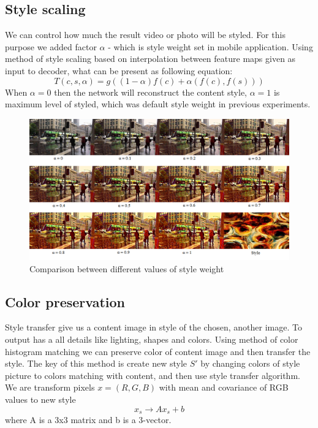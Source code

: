 \documentclass[../Main.tex]{subfiles}
\begin{document}
\subsection{Style scaling}
We can control how much the result video or photo will be styled. For this purpose we added factor $\alpha$ -  which is style weight set in mobile application. Using method of style scaling based on interpolation between feature maps given as input to decoder, what can be present as following equation: $$T(c,s,\alpha) = g((1-\alpha)f(c)+\alpha (f(c),f(s)))$$ When $\alpha= 0$  then the network will reconstruct the content style, $\alpha = 1$ is maximum level of styled, which was default style weight in previous experiments. 

\begin{figure}[h!]
    \centering
    \includegraphics[scale=0.75]{Images/style1.png}
    \caption{Comparison between different values of style weight}
    \label{fig:style1}
\end{figure}

\subsection{Color preservation}
Style transfer give us a content image in style of the chosen, another image. To output has a all details like lighting, shapes and colors. Using method of color histogram matching we can preserve color of content image and then transfer the style. The key of this method is create new style $S'$ by changing colors of style picture to colors matching with content, and then use style transfer algorithm. 
We are transform pixels $x=(R,G,B)$ with mean and covariance of RGB values to new style $$x_s\rightarrow{}Ax_s+b$$ where A is a 3x3 matrix and b is a 3-vector.
\end{document}
